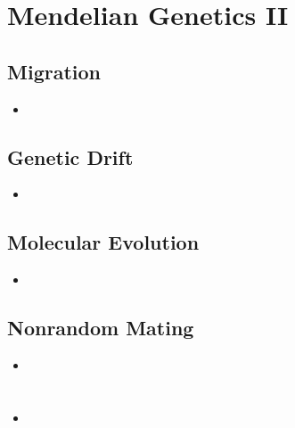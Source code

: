 \documentclass[12pt,a4paper]{article}
\begin{document}
\clearpage
\clearpage
\section{Mendelian Genetics II}
\subsection{Migration}
\begin{itemize}
    \item 
\end{itemize}

\subsection{Genetic Drift}
\begin{itemize}
    \item 
\end{itemize}

\subsection{Molecular Evolution}
\begin{itemize}
    \item 
\end{itemize}

\subsection{Nonrandom Mating}
\begin{itemize}
    \item 
\end{itemize}

\clearpage
{}


\clearpage
\section{}
\subsection{}
\begin{itemize}
    \item 
\end{itemize}
\end{document}

